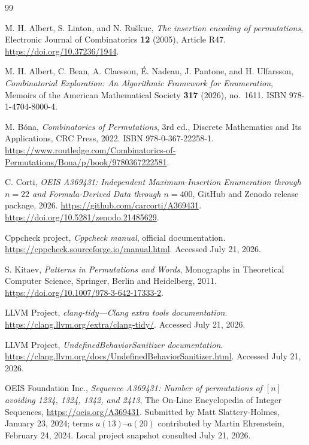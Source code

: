 \documentclass[11pt]{article}
\theoremstyle{definition}
\theoremstyle{remark}
\begin{document}
\clearpage
\begin{thebibliography}{99}
\sloppy
\raggedright

M. H. Albert, S. Linton, and N. Ru\v{s}kuc,
\emph{The insertion encoding of permutations},
Electronic Journal of Combinatorics \textbf{12} (2005), Article R47.
\url{https://doi.org/10.37236/1944}.

M. H. Albert, C. Bean, A. Claesson, \'E. Nadeau, J. Pantone, and
H. Ulfarsson,
\emph{Combinatorial Exploration: An Algorithmic Framework for Enumeration},
Memoirs of the American Mathematical Society \textbf{317} (2026), no.~1611.
ISBN 978-1-4704-8000-4.

M. B\'ona,
\emph{Combinatorics of Permutations}, 3rd ed.,
Discrete Mathematics and Its Applications, CRC Press, 2022.
ISBN 978-0-367-22258-1.
\url{https://www.routledge.com/Combinatorics-of-Permutations/Bona/p/book/9780367222581}.

C. Corti,
\emph{OEIS A369431: Independent Maximum-Insertion Enumeration through
$n=22$ and Formula-Derived Data through $n=400$},
GitHub and Zenodo release package, 2026.
\url{https://github.com/carcorti/A369431}.
\url{https://doi.org/10.5281/zenodo.21485629}.

Cppcheck project,
\emph{Cppcheck manual}, official documentation.
\url{https://cppcheck.sourceforge.io/manual.html}.
Accessed July 21, 2026.

S. Kitaev,
\emph{Patterns in Permutations and Words},
Monographs in Theoretical Computer Science, Springer, Berlin and Heidelberg,
2011.
\url{https://doi.org/10.1007/978-3-642-17333-2}.

LLVM Project,
\emph{clang-tidy---Clang extra tools documentation}.
\url{https://clang.llvm.org/extra/clang-tidy/}.
Accessed July 21, 2026.

LLVM Project,
\emph{UndefinedBehaviorSanitizer documentation}.
\url{https://clang.llvm.org/docs/UndefinedBehaviorSanitizer.html}.
Accessed July 21, 2026.

OEIS Foundation Inc.,
\emph{Sequence A369431: Number of permutations of $[n]$ avoiding 1234, 1324,
1342, and 2413},
The On-Line Encyclopedia of Integer Sequences,
\url{https://oeis.org/A369431}.
Submitted by Matt Slattery-Holmes, January 23, 2024; terms $a(13)$--$a(20)$
contributed by Martin Ehrenstein, February 24, 2024.  Local project snapshot
consulted July 21, 2026.


\end{thebibliography}
\end{document}
